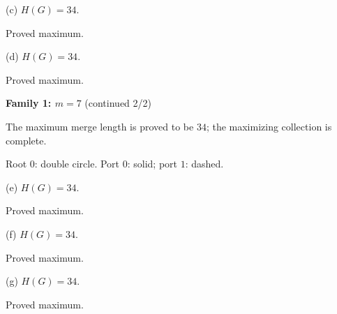 \documentclass[10pt,a4paper]{article}
\begin{document}
\par\vspace{2.5mm}
\noindent\hfill
\begin{minipage}[t]{.48\textwidth}\centering
\resizebox{8.2cm}{!}{}\par
{\footnotesize (c) $H(G)=34$.\par Proved maximum.}\par
\end{minipage}\hfill
\begin{minipage}[t]{.48\textwidth}\centering
\resizebox{8.2cm}{!}{}\par
{\footnotesize (d) $H(G)=34$.\par Proved maximum.}\par
\end{minipage}\hfill
\par\vspace{2.5mm}
\clearpage
{\Large\bfseries Family 1: $m=7$} (continued 2/2)\par
\vspace{2mm}
{\small The maximum merge length is proved to be $34$; the maximizing collection is complete.}\par
\vspace{1mm}
{\small Root $0$: double circle. Port $0$: solid; port $1$: dashed.}\par
\vspace{3mm}
\noindent\hfill
\begin{minipage}[t]{.48\textwidth}\centering
\resizebox{8.2cm}{!}{}\par
{\footnotesize (e) $H(G)=34$.\par Proved maximum.}\par
\end{minipage}\hfill
\begin{minipage}[t]{.48\textwidth}\centering
\resizebox{8.2cm}{!}{}\par
{\footnotesize (f) $H(G)=34$.\par Proved maximum.}\par
\end{minipage}\hfill
\par\vspace{2.5mm}
\noindent\hfill
\begin{minipage}[t]{.48\textwidth}\centering
\resizebox{8.2cm}{!}{}\par
{\footnotesize (g) $H(G)=34$.\par Proved maximum.}\par
\end{minipage}\hfill
\end{document}
